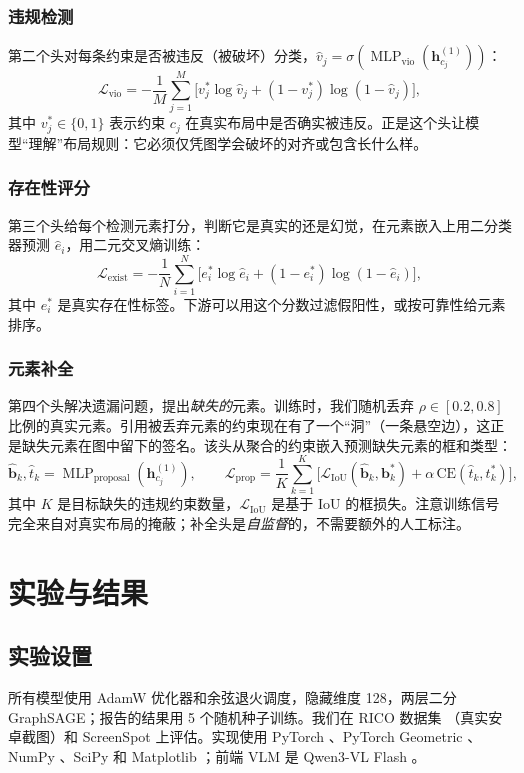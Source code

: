 \documentclass[11pt, letterpaper]{ctexart}
\begin{document}
\subsubsection{违规检测}
第二个头对每条约束是否被违反（被破坏）分类，$\hat{v}_j=\sigma(\operatorname{MLP}_{\text{vio}}(\mathbf{h}_{c_j}^{(1)}))$：
\begin{equation}
\mathcal{L}_{\text{vio}}=-\frac{1}{M}\sum_{j=1}^{M}\bigl[
v_j^*\log\hat{v}_j+(1-v_j^*)\log(1-\hat{v}_j)\bigr],
\label{eq:lvio}
\end{equation}
其中 $v_j^*\in\{0,1\}$ 表示约束 $c_j$ 在真实布局中是否确实被违反。正是这个头让模型“理解”布局规则：它必须仅凭图学会破坏的对齐或包含长什么样。

\subsubsection{存在性评分}
第三个头给每个检测元素打分，判断它是真实的还是幻觉，在元素嵌入上用二分类器预测 $\hat{e}_i$，用二元交叉熵训练：
\begin{equation}
\mathcal{L}_{\text{exist}}=-\frac{1}{N}\sum_{i=1}^{N}\bigl[
e_i^*\log\hat{e}_i+(1-e_i^*)\log(1-\hat{e}_i)\bigr],
\label{eq:lexist}
\end{equation}
其中 $e_i^*$ 是真实存在性标签。下游可以用这个分数过滤假阳性，或按可靠性给元素排序。

\subsubsection{元素补全}
第四个头解决遗漏问题，提出\emph{缺失的}元素。训练时，我们随机丢弃 $\rho\in[0.2,0.8]$ 比例的真实元素。引用被丢弃元素的约束现在有了一个“洞”（一条悬空边），这正是缺失元素在图中留下的签名。该头从聚合的约束嵌入预测缺失元素的框和类型：
\begin{equation}
\hat{\mathbf{b}}_k,\hat{t}_k=
\operatorname{MLP}_{\text{proposal}}(\mathbf{h}_{c_j}^{(1)}),
\qquad
\mathcal{L}_{\text{prop}}=\frac{1}{K}\sum_{k=1}^{K}\bigl[
\mathcal{L}_{\text{IoU}}(\hat{\mathbf{b}}_k,\mathbf{b}_k^*)
+\alpha\,\mathrm{CE}(\hat{t}_k,t_k^*)\bigr],
\label{eq:lprop}
\end{equation}
其中 $K$ 是目标缺失的违规约束数量，$\mathcal{L}_{\text{IoU}}$ 是基于 IoU 的框损失。注意训练信号完全来自对真实布局的掩蔽；补全头是\emph{自监督}的，不需要额外的人工标注。

\section{实验与结果}
\subsection{实验设置}
所有模型使用 AdamW 优化器和余弦退火调度，隐藏维度 128，两层二分 GraphSAGE；报告的结果用 5 个随机种子训练。我们在 RICO 数据集 \cite{dek.a17rico}（真实安卓截图）和 ScreenSpot \cite{cheng2024seclick} 上评估。实现使用 PyTorch \cite{paszke2019pytorch}、PyTorch Geometric \cite{fey2019pyg}、NumPy \cite{harris2020numpy}、SciPy \cite{virtanen2020scipy} 和 Matplotlib \cite{hunter2007matplotlib}；前端 VLM 是 Qwen3-VL Flash \cite{bai2023qwen}。
\end{document}
